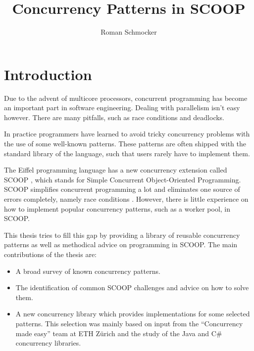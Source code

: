\documentclass[a4paper,10pt]{article}
\title{Concurrency Patterns in SCOOP}
\author{Roman Schmocker}
\begin{document}
\maketitle

\begin{abstract}

\end{abstract}

\tableofcontents

\section{Introduction}
\label{sec:introduction}

Due to the advent of multicore processors, concurrent programming has become an important part in software engineering.
Dealing with parallelism isn't easy however.
There are many pitfalls, such as race conditions and deadlocks.

In practice programmers have learned to avoid tricky concurrency problems with the use of some well-known patterns.
These patterns are often shipped with the standard library of the language, such that users rarely have to implement them.

The Eiffel programming language \cite{EcmaEiffel}\cite{book:touchofclass} has a new concurrency extension called SCOOP \cite{Nienaltowski07}\cite{web:scoop},
which stands for Simple Concurrent Object-Oriented Programming.
SCOOP simplifies concurrent programming a lot and eliminates one source of errors completely, namely race conditions \cite{Nienaltowski07}.
However, there is little experience on how to implement popular concurrency patterns, such as a worker pool, in SCOOP.

This thesis tries to fill this gap by providing a library of reusable concurrency patterns as well as methodical advice on programming in SCOOP.
The main contributions of the thesis are:
\begin{itemize}
 \item A broad survey of known concurrency patterns.
 \item The identification of common SCOOP challenges and advice on how to solve them.
 \item A new concurrency library which provides implementations for some selected patterns.
 This selection was mainly based on input from the ``Concurrency made easy'' team at ETH Zürich and the study of the Java \cite{web:java-concurrency} and C\# \cite{web:ms-tpl} concurrency libraries.
\end{itemize}
\end{document}
